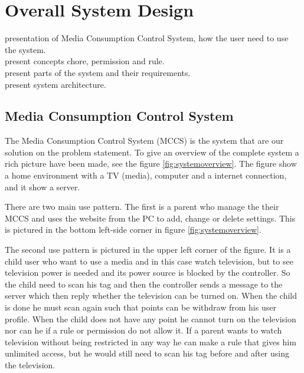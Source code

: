 \chapter{Overall System Design}
presentation of Media Consumption Control System, how the user need to use the system.\\
present concepts chore, permission and rule.\\
present parts of the system and their requirements. \\
present system architecture. \\

\section{Media Consumption Control System} %
The Media Consumption Control System (MCCS) is the system that are our solution on the problem statement. To give an overview of the complete system a rich picture have been made, see the figure \ref{fig:systemoverview}. The figure show a home environment with a TV (media), computer and a internet connection, and it show a server. 

There are two main use pattern. The first is a parent who manage the their MCCS and uses the website from the PC to add, change or delete settings. This is pictured in the bottom left-side corner in figure \ref{fig:systemoverview}. 

The second use pattern is pictured in the upper left corner of the figure. It is a child user who want to use a media and in this case watch television, but to see television power is needed and its power source is blocked by the controller. So the child need to scan his tag and then the controller sends a message to the server which then reply whether the television can be turned on. When the child is done he must scan again such that points can be withdraw from his user profile. When the child does not have any point he cannot turn on the television nor can he if a rule or permission do not allow it. If a parent wants to watch television without being restricted in any way he can make a rule that gives him unlimited access, but he would still need to scan his tag before and after using the television.


